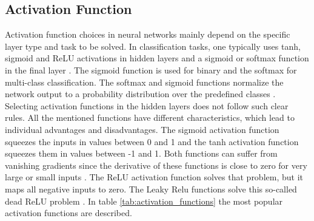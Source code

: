 \subsection{Activation Function}
Activation function choices in neural networks mainly depend on the specific layer type and task to be solved. In classification tasks, one typically uses tanh, sigmoid and ReLU activations in hidden layers and a sigmoid or softmax function in the final layer \cite{ShilohPerl2020}. The sigmoid function is used for binary and the softmax for multi-class classification. The softmax and sigmoid functions normalize the network output to a probability distribution over the predefined classes \cite{ShilohPerl2020}. Selecting activation functions in the hidden layers does not follow such clear rules. All the mentioned functions have different characteristics, which lead to individual advantages and disadvantages. The sigmoid activation function squeezes the inputs in values between 0 and 1 and the tanh activation function squeezes them in values between -1 and 1. Both functions can suffer from vanishing gradients since the derivative of these functions is close to zero for very large or small inputs \cite{Calin2020}. The ReLU activation function solves that problem, but it maps all negative inputs to zero. The Leaky Relu functions solve this so-called dead ReLU problem \cite{Dubey2019}. In table \ref{tab:activation_functions} the most popular activation functions are described.

